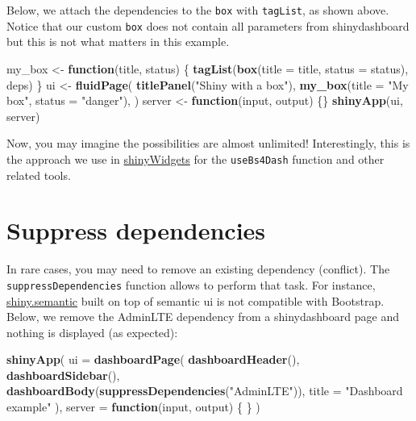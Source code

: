 \documentclass[]{book}
\newenvironment{Shaded}{\begin{snugshade}}{\end{snugshade}}
\newcommand{\ControlFlowTok}[1]{\textcolor[rgb]{0.13,0.29,0.53}{\textbf{#1}}}
\newcommand{\DataTypeTok}[1]{\textcolor[rgb]{0.13,0.29,0.53}{#1}}
\newcommand{\KeywordTok}[1]{\textcolor[rgb]{0.13,0.29,0.53}{\textbf{#1}}}
\newcommand{\NormalTok}[1]{#1}
\newcommand{\StringTok}[1]{\textcolor[rgb]{0.31,0.60,0.02}{#1}}
\begin{document}
Below, we attach the dependencies to the \texttt{box} with \texttt{tagList}, as shown above. Notice that our custom \texttt{box} does not contain all parameters from shinydashboard but this is not what matters in this example.

\begin{Shaded}
\begin{Highlighting}[]
\NormalTok{my_box <-}\StringTok{ }\ControlFlowTok{function}\NormalTok{(title, status) \{}
  \KeywordTok{tagList}\NormalTok{(}\KeywordTok{box}\NormalTok{(}\DataTypeTok{title =}\NormalTok{ title, }\DataTypeTok{status =}\NormalTok{ status), deps)}
\NormalTok{\}}
\NormalTok{ui <-}\StringTok{ }\KeywordTok{fluidPage}\NormalTok{(}
  \KeywordTok{titlePanel}\NormalTok{(}\StringTok{"Shiny with a box"}\NormalTok{),}
  \KeywordTok{my_box}\NormalTok{(}\DataTypeTok{title =} \StringTok{"My box"}\NormalTok{, }\DataTypeTok{status =} \StringTok{"danger"}\NormalTok{),}
\NormalTok{)}
\NormalTok{server <-}\StringTok{ }\ControlFlowTok{function}\NormalTok{(input, output) \{\}}
\KeywordTok{shinyApp}\NormalTok{(ui, server)}
\end{Highlighting}
\end{Shaded}

Now, you may imagine the possibilities are almost unlimited! Interestingly, this
is the approach we use in \href{https://github.com/dreamRs/shinyWidgets/blob/master/R/useBs4Dash.R}{shinyWidgets} for
the \texttt{useBs4Dash} function and other related tools.

\hypertarget{suppress-dependencies}{%
\section{Suppress dependencies}\label{suppress-dependencies}}

In rare cases, you may need to remove an existing dependency (conflict). The \texttt{suppressDependencies} function allows to perform that task. For instance, \href{https://github.com/Appsilon/shiny.semantic}{shiny.semantic} built on top of
semantic ui is not compatible with Bootstrap. Below, we remove the AdminLTE dependency
from a shinydashboard page and nothing is displayed (as expected):

\begin{Shaded}
\begin{Highlighting}[]
\KeywordTok{shinyApp}\NormalTok{(}
  \DataTypeTok{ui =} \KeywordTok{dashboardPage}\NormalTok{(}
    \KeywordTok{dashboardHeader}\NormalTok{(),}
    \KeywordTok{dashboardSidebar}\NormalTok{(),}
    \KeywordTok{dashboardBody}\NormalTok{(}\KeywordTok{suppressDependencies}\NormalTok{(}\StringTok{"AdminLTE"}\NormalTok{)),}
    \DataTypeTok{title =} \StringTok{"Dashboard example"}
\NormalTok{  ),}
  \DataTypeTok{server =} \ControlFlowTok{function}\NormalTok{(input, output) \{ \}}
\NormalTok{)}
\end{Highlighting}
\end{Shaded}
\end{document}

